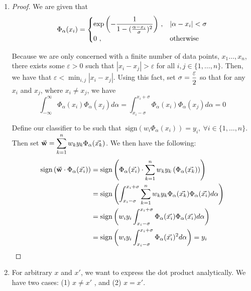 \documentclass[twoside,11pt]{homework}
\DeclarePairedDelimiter{\2norm}{\lVert}{\rVert^2_2}
\newcommand{\1}[1]{\mathds{1}\left[#1\right]}
\begin{document}
\begin{enumerate}[\bf (i)]

\item 
\begin{proof}
We are given that $$\Phi_{\alpha}(x_i) = \begin{cases} \mathlarger{\text{exp}\left(-\frac{1}{1-(\frac{\alpha-x_i}{\sigma})^2}\right)} \ , & |\alpha - x_i| < \sigma \\ 0 \ ,& \text{otherwise} \end{cases}$$


Because we are only concerned with a finite number of data points, $x_1 \dots , x_n$, there exists some $\varepsilon > 0$ such that $|x_i - x_j| > \varepsilon$ for all $i, j \in \{1, \dots, n\}$. Then, we have that $\varepsilon < \min_{i,j}|x_i - x_j|$. Using this fact, set $\mathlarger{\sigma = \frac{\varepsilon}{2}}$ so that for any $x_i$ and $x_j$, where $x_i \neq x_j$, we have
$$\int_{-\infty}^{\infty} \Phi_{\alpha}(x_i)\Phi_{\alpha}(x_j)d\alpha = \int_{x_i-\sigma}^{x_i + \sigma}\Phi_{\alpha}(x_i)\Phi_{\alpha}(x_j)d\alpha = 0$$

Define our classifier to be such that $ \ \text{sign}(w_i \Phi_{\alpha}(x_i)) = y_i , \ \forall i \in \{1, \dots, n\}$.  \\ 
Then set $\mathlarger{\vec{\bf w} = \sum_{k=1}^n w_k y_k \Phi_{\alpha}(\vec{x_k})}$. We then have the following:
\begin{align*}
\text{sign}\left(\vec{\bf w}\cdot \Phi_{\alpha}(\vec{x_i})\right) & =  \text{sign}\left(\Phi_{\alpha}(\vec{x_i}) \cdot \sum_{k=1}^n w_k y_k \left(\Phi_{\alpha}(\vec{x_k})\right)\right)  \\
& = \text{sign}\left(\int_{x_i-\sigma}^{x_i + \sigma}\sum_{k=1}^n w_k y_k \Phi_{\alpha}(\vec{x_k}) \Phi_{\alpha}(\vec{x_i})d\alpha\right) \\
& = \text{sign}\left(w_i y_i\int_{x_i-\sigma}^{x_i + \sigma}\Phi_{\alpha}(\vec{x_i}) \Phi_{\alpha}(\vec{x_i})d\alpha\right) \\
& = \text{sign}\left(w_i y_i\int_{x_i-\sigma}^{x_i + \sigma}\Phi_{\alpha}(\vec{x_i})^2d\alpha\right) = y_i
\end{align*}

\end{proof}

\item For arbitrary $x$ and $x'$, we want to express the dot product analytically. We have two cases: (1) $x \neq x '$ , and (2) $x = x'$.  \\


\end{enumerate}
\end{document}

